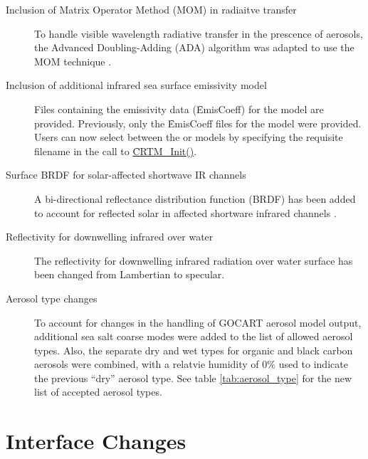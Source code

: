 \begin{description}
\item[Inclusion of Matrix Operator Method (MOM) in radiaitve transfer] To handle visible wavelength radiative transfer in the prescence of aerosols, the Advanced Doubling-Adding (ADA) algorithm was adapted to use the MOM technique \citep{Liu_1996}.

\item[Inclusion of additional infrared sea surface emissivity model] Files containing the emissivity data (\f{EmisCoeff}) for the \citet{Nalli_2008a} model are provided. Previously, only the \f{EmisCoeff} files for the \citet{WuSmith_1997} model were provided. Users can now select between the \citet{Nalli_2008a} or \citet{WuSmith_1997} models by specifying the requisite filename in the call to \hyperref[sec:CRTM_Init_interface]{\f{CRTM\_Init()}}.

\item[Surface BRDF for solar-affected shortwave IR channels] A bi-directional reflectance distribution function (BRDF) has been added to account for reflected solar in affected shortware infrared channels \citep{Breon_1993}.

\item[Reflectivity for downwelling infrared over water] The reflectivity for downwelling infrared  radiation over water surface has been changed from Lambertian to specular.

\item[Aerosol type changes] To account for changes in the handling of GOCART \citep{Chin_2002} aerosol model output, additional sea salt coarse modes were added to the list of allowed aerosol types. Also, the separate dry and wet types for organic and black carbon aerosols were combined, with a relatvie humidity of 0\% used to indicate the previous ``dry'' aerosol type. See table \ref{tab:aerosol_type} for the new list of accepted aerosol types.

\end{description}


\section*{Interface Changes}
\label{sec:new_interface_changes}

